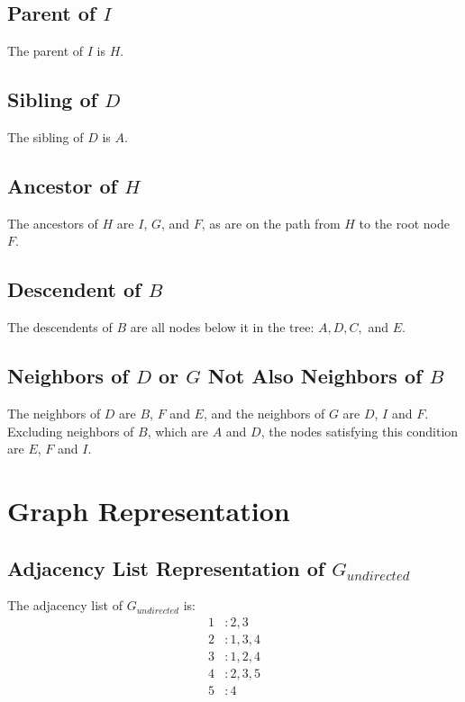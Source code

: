 \documentclass[10pt]{article}
\begin{document}
\subsection{Parent of \( I \)}
The parent of \( I \) is \( H \).

\subsection{Sibling of \( D \)}
The sibling of \( D \) is \( A \).

\subsection{Ancestor of \( H \)}
The ancestors of \( H \) are \( I \), \( G \), and $F$, as are on the path from \( H \) to the root node \( F \).

\subsection{Descendent of \( B \)}
The descendents of \( B \) are all nodes below it in the tree: \( A, D, C, \) and \( E \).

\subsection{Neighbors of \( D \) or \( G \) Not Also Neighbors of \( B \)}
The neighbors of \( D \) are \( B \), $F$ and \( E \), and the neighbors of \( G \) are \( D \), $I$ and \( F \). Excluding neighbors of \( B \), which are $A$ and $D$, the nodes satisfying this condition are $E$, \( F \) and $I$.

\newpage

\section{Graph Representation}

\subsection{Adjacency List Representation of \( G_{undirected} \)}
The adjacency list of \( G_{undirected} \) is:
\[
\begin{aligned}
    1 & : 2, 3 \\
    2 & : 1, 3, 4 \\
    3 & : 1, 2, 4 \\
    4 & : 2, 3, 5 \\
    5 & : 4
\end{aligned}
\]
\end{document}
